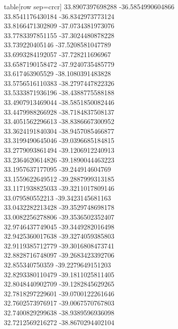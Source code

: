   table[row sep=crcr]{%
33.8907397698288	-36.5854990604866\\
33.8541176430184	-36.8342973773124\\
33.8166471302809	-37.0734381973076\\
33.7783397851155	-37.3024480878228\\
33.739220405146	-37.5208581047789\\
33.6993284192057	-37.728211696967\\
33.6587190158472	-37.9240735485779\\
33.617463905529	-38.1080391483828\\
33.5756516110383	-38.2797447822326\\
33.5333871936196	-38.4388775588188\\
33.4907913469044	-38.5851850082446\\
33.4479988266928	-38.7184837508137\\
33.4051562296613	-38.8386667300952\\
33.3624191840304	-38.9457085466877\\
33.3199490645046	-39.0396685184815\\
33.2779093861494	-39.1206912240913\\
33.2364620614826	-39.1890044463223\\
33.1957637177095	-39.244914604769\\
33.1559622649512	-39.2887999313185\\
33.1171938825033	-39.3211017809146\\
33.079580552213	-39.3423145681163\\
33.0432282213428	-39.3529748698178\\
33.0082256278806	-39.3536502352407\\
32.9746437749045	-39.3449282016498\\
32.9425360017638	-39.3274059385803\\
32.9119385712779	-39.3016808473741\\
32.8828716748097	-39.2683423392706\\
32.855340750359	-39.2279649151203\\
32.8293380110479	-39.1811025811405\\
32.8048440902709	-39.1282845629265\\
32.7818297229601	-39.0700122261646\\
32.7602573976917	-39.0067570767803\\
32.7400829299638	-38.9389596936098\\
32.7212569216272	-38.8670294402104\\
}

